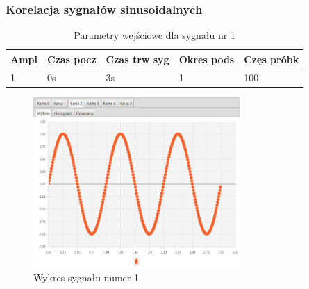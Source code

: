 \documentclass[12pt]{article}
\begin{document}
{{            \subsubsection{Korelacja sygnałów sinusoidalnych} \label{eksperyment:korelacja1}{

                \begin{table}[H]
                    \centering
                    \begin{tabular}{|l|l|l|l|l|}
                        \hline
                        Ampl & Czas pocz & Czas trw syg & Okres pods & Częs próbk   \\ \hline
                        1 & 0s & 3s & 1 & 100           \\ \hline
                    \end{tabular}
                    \caption{Parametry wejściowe dla sygnału nr 1}
                \end{table}
                \begin{figure}[H]
                    \centering
                    \includegraphics[width=0.7\textwidth]{img/result/correlation/experiment1/data_105849.png}
                    \caption{Wykres sygnału numer 1}
                \end{figure}

}}}
\end{document}
